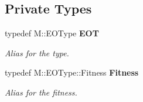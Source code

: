 \subsection*{Private Types}
\begin{CompactItemize}
\item 
typedef M::EOType {\bf EOT}\label{classmo_t_s_move_loop_expl_47f42225e2ed096374b818bdb848a527}

\begin{CompactList}\small\item\em Alias for the type. \item\end{CompactList}\item 
typedef M::EOType::Fitness {\bf Fitness}\label{classmo_t_s_move_loop_expl_a1ba36c937b195ca2f7d1a24adaa7018}

\begin{CompactList}\small\item\em Alias for the fitness. \item\end{CompactList}\end{CompactItemize}

